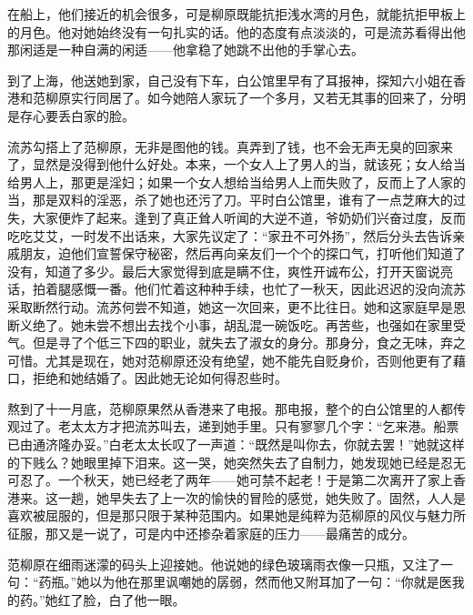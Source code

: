 \par 在船上，他们接近的机会很多，可是柳原既能抗拒浅水湾的月色，就能抗拒甲板上的月色。他对她始终没有一句扎实的话。他的态度有点淡淡的，可是流苏看得出他那闲适是一种自满的闲适——他拿稳了她跳不出他的手掌心去。
\par 到了上海，他送她到家，自己没有下车，白公馆里早有了耳报神，探知六小姐在香港和范柳原实行同居了。如今她陪人家玩了一个多月，又若无其事的回来了，分明是存心要丢白家的脸。
\par 流苏勾搭上了范柳原，无非是图他的钱。真弄到了钱，也不会无声无臭的回家来了，显然是没得到他什么好处。本来，一个女人上了男人的当，就该死；女人给当给男人上，那更是淫妇；如果一个女人想给当给男人上而失败了，反而上了人家的当，那是双料的淫恶，杀了她也还污了刀。平时白公馆里，谁有了一点芝麻大的过失，大家便炸了起来。逢到了真正耸人听闻的大逆不道，爷奶奶们兴奋过度，反而吃吃艾艾，一时发不出话来，大家先议定了：“家丑不可外扬”，然后分头去告诉亲戚朋友，迫他们宣誓保守秘密，然后再向亲友们一个个的探口气，打听他们知道了没有，知道了多少。最后大家觉得到底是瞒不住，爽性开诚布公，打开天窗说亮话，拍着腿感慨一番。他们忙着这种种手续，也忙了一秋天，因此迟迟的没向流苏采取断然行动。流苏何尝不知道，她这一次回来，更不比往日。她和这家庭早是恩断义绝了。她未尝不想出去找个小事，胡乱混一碗饭吃。再苦些，也强如在家里受气。但是寻了个低三下四的职业，就失去了淑女的身分。那身分，食之无味，弃之可惜。尤其是现在，她对范柳原还没有绝望，她不能先自贬身价，否则他更有了藉口，拒绝和她结婚了。因此她无论如何得忍些时。
\par 熬到了十一月底，范柳原果然从香港来了电报。那电报，整个的白公馆里的人都传观过了。老太太方才把流苏叫去，递到她手里。只有寥寥几个字：“乞来港。船票已由通济隆办妥。”白老太太长叹了一声道：“既然是叫你去，你就去罢！”她就这样的下贱么？她眼里掉下泪来。这一哭，她突然失去了自制力，她发现她已经是忍无可忍了。一个秋天，她已经老了两年——她可禁不起老！于是第二次离开了家上香港来。这一趟，她早失去了上一次的愉快的冒险的感觉，她失败了。固然，人人是喜欢被屈服的，但是那只限于某种范围内。如果她是纯粹为范柳原的风仪与魅力所征服，那又是一说了，可是内中还掺杂着家庭的压力——最痛苦的成分。
\par 范柳原在细雨迷濛的码头上迎接她。他说她的绿色玻璃雨衣像一只瓶，又注了一句：“药瓶。”她以为他在那里讽嘲她的孱弱，然而他又附耳加了一句：“你就是医我的药。”她红了脸，白了他一眼。
